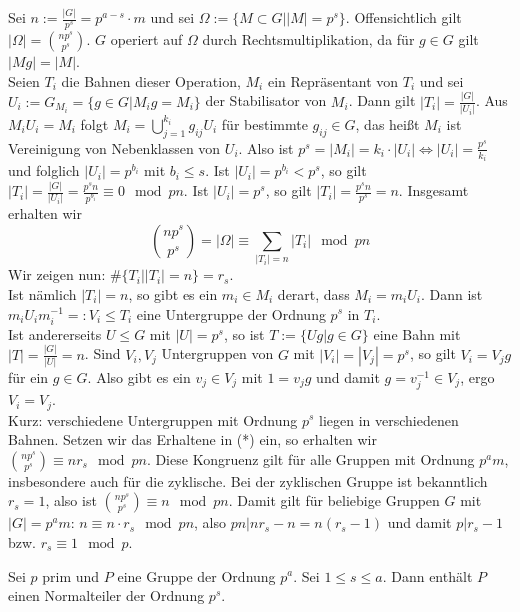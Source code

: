 \begin{beweis}
Sei $n:=\frac{|G|}{p^s}=p^{a-s}\cdot m$ und sei $\Omega:=\lbrace M\subset G| |M|=p^s \rbrace$. Offensichtlich gilt $|\Omega|=\binom{np^s}{p^s}$. $G$ operiert auf $\Omega$ durch Rechtsmultiplikation, da f\"ur $g\in G$ gilt $|Mg|=|M|$.\\
Seien $T_i$ die Bahnen dieser Operation, $M_i$ ein Repr\"asentant von $T_i$ und sei $U_i:=G_{M_i}=\lbrace g\in G|M_ig=M_i \rbrace$ der Stabilisator von $M_i$. Dann gilt $|T_i|=\frac{|G|}{|U_i|}$. Aus $M_iU_i=M_i$ folgt $M_i=\bigcup_{j=1}^{k_i}g_{ij}U_i$ f\"ur bestimmte $g_{ij}\in G$, das hei\ss{}t $M_i$ ist Vereinigung von Nebenklassen von $U_i$. Also ist $p^s=|M_i|=k_i\cdot|U_i|\Longleftrightarrow |U_i|=\frac{p^s}{k_i}$ und folglich $|U_i|=p^{b_i}$ mit $b_i\leq s$.
Ist $|U_i|=p^{b_i}< p^s$, so gilt $|T_i|=\frac{|G|}{|U_i|}=\frac{p^sn}{p^{b_i}}\equiv 0 \mod pn$. Ist $|U_i|=p^s$, so gilt $|T_i|=\frac{p^sn}{p^s}=n$. Insgesamt erhalten wir \begin{equation}\binom{np^s}{p^s}=|\Omega|\equiv \sum_{|T_i|=n}|T_i|\mod pn \tag{*}\end{equation}
 Wir zeigen nun: $\#\lbrace T_i||T_i|=n\rbrace =r_s$. \\Ist n\"amlich $|T_i|=n$, so gibt es ein $m_i\in M_i$ derart, dass $M_i=m_iU_i$. Dann ist $m_iU_im_i^{-1}=:V_i\leq T_i$ eine Untergruppe der Ordnung $p^s$ in $T_i$.\\Ist andererseits $U\leq G$ mit $|U|=p^s$, so ist $T:=\lbrace Ug|g\in G\rbrace$ eine Bahn mit $|T|=\frac{|G|}{|U|}=n$. Sind $V_i, V_j$ Untergruppen von $G$ mit $|V_i|=|V_j|=p^s$, so gilt $V_i=V_jg$ f\"ur ein $g\in G$. Also gibt es ein $v_j\in V_j$ mit $1=v_jg$ und damit $g=v_j^{-1}\in V_j$, ergo $V_i=V_j$.\\
Kurz: verschiedene Untergruppen mit Ordnung $p^s$ liegen in verschiedenen Bahnen.
Setzen wir das Erhaltene in (*) ein, so erhalten wir $\binom{np^s}{p^s}\equiv nr_s\mod pn$. Diese Kongruenz gilt f\"ur alle Gruppen mit Ordnung $p^am$, insbesondere auch f\"ur die zyklische. Bei der zyklischen Gruppe ist bekanntlich $r_s=1$, also ist $\binom{np^s}{p^s}\equiv n\mod pn$. Damit gilt f\"ur beliebige Gruppen $G$ mit $|G|=p^am$: $n\equiv n\cdot r_s\mod pn$, also $pn|nr_s-n=n(r_s-1)$ und damit $p|r_s-1$ bzw. $r_s\equiv 1\mod p$.
\end{beweis}



\begin{folgerung} \label{5.10}
 Sei $p$ prim und $P$ eine Gruppe der Ordnung $p^a$. Sei $1\leq s\leq a$. Dann enth\"alt $P$ einen Normalteiler der Ordnung $p^s$.
\end{folgerung}


